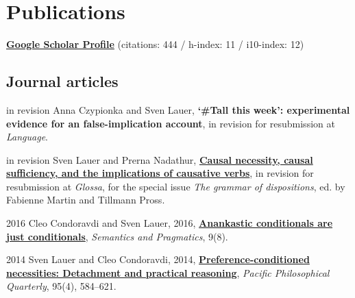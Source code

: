 \section*{Publications}
\href{https://scholar.google.de/citations?user=D6WVFSYAAAAJ}{\textbf{Google Scholar Profile}} (citations: 444 / h-index: 11 / i10-index: 12)
\subsection*{Journal articles}
\begin{dated}
	\item[in revision]
		Anna Czypionka and Sven Lauer, 
		\textbf{`\#Tall this week': experimental evidence for an false-implication account}, 
		in revision for resubmission at \textit{Language}.
	\item[in revision]
		Sven Lauer and Prerna Nadathur, 
		\href{http://sven-lauer.net/output/LauerNadathur-CausalSufficiency.pdf}{\textbf{Causal necessity, causal sufficiency, and the implications of causative verbs}}, 
		in revision for resubmission at {\it Glossa}, for the special issue \textit{The grammar of dispositions}, ed. by Fabienne Martin and Tillmann Pross.
	\item[2016]
		Cleo Condoravdi and Sven Lauer, 2016,
		\href{http://dx.doi.org/10.3765/sp.9.8}{\textbf{Anankastic conditionals are just conditionals}},
		\textit{Semantics and Pragmatics}, 9(8).
	\item[2014]
		Sven Lauer and Cleo Condoravdi, 2014,
		\href{http://web.stanford.edu/~cleoc/Pac-Phil-Quart-preprint.pdf}{\textbf{Preference-conditioned necessities: Detachment and practical reasoning}},
		\textit{Pacific Philosophical Quarterly}, 95(4), 584--621.
\end{dated}

